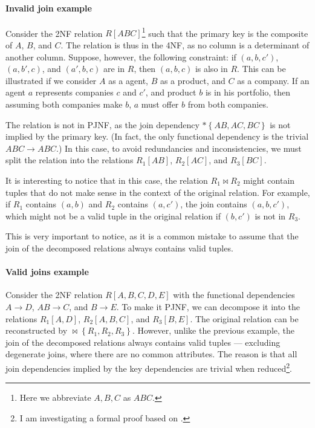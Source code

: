 \paragraph{Invalid join example} Consider the 2NF relation $R[ABC]$\footnote{Here we abbreviate ${A,
B, C}$ as $ABC$.} such that the primary key is the composite of $A$, $B$, and $C$.  The
relation is thus in the 4NF, as no column is a determinant of another column.  Suppose,
however, the following constraint: if $(a, b, c')$, $(a, b', c)$, and $(a', b, c)$ are in
$R$, then $(a, b, c)$ is also in $R$.  This can be illustrated if we consider $A$ as a
agent, $B$ as a product, and $C$ as a company.  If an agent $a$ represents companies $c$ and
$c'$, and product $b$ is in his portfolio, then assuming both companies make $b$, $a$
must offer $b$ from both companies.

The relation is not in PJNF, as the join dependency $* \left\{ AB, AC, BC \right\}$ is not
implied by the primary key.  (In fact, the only functional dependency is the trivial $ABC
\to ABC$.)  In this case, to avoid redundancies and inconsistencies, we must split the
relation into the relations $R_1[AB]$, $R_2[AC]$, and $R_3[BC]$.

It is interesting to notice that in this case, the relation $R_1 \bowtie R_2$ might
contain tuples that do not make sense in the context of the original relation.  For
example, if $R_1$ contains $(a, b)$ and $R_2$ contains $(a, c')$, the join contains
$(a, b, c')$, which might not be a valid tuple in the original relation if $(b, c')$ is
not in $R_3$.

  This is very important to notice, as it is a common mistake to assume
  that the join of the decomposed relations always contains valid tuples.

\paragraph{Valid joins example}  Consider the 2NF relation $R[A, B, C, D, E]$ with the functional
dependencies $A \to D$, $AB \to C$, and $B \to E$.  To make it PJNF, we can decompose it
into the relations $R_1[A, D]$, $R_2[A, B, C]$, and $R_3[B, E]$.  The original relation can
be reconstructed by $\bowtie \left\{ R_1, R_2, R_3 \right\}$.  However, unlike the
previous example, the join of the decomposed relations always contains valid tuples
--- excluding degenerate joins, where there are no common attributes.
The reason is that all join dependencies implied by the key dependencies are trivial when
reduced\footnote{I am investigating a formal proof based on .}.

